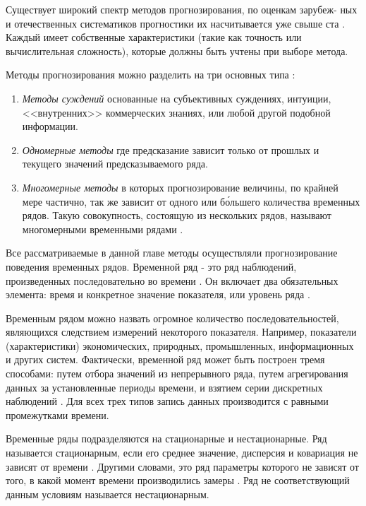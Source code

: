 \documentclass[a4paper,14pt,russian]{extreport}
\begin{document}
Существует широкий спектр методов прогнозирования, по оценкам зарубеж-
ных и отечественных систематиков прогностики их насчитывается
уже свыше ста \cite{tihonov2006}. Каждый имеет собственные характеристики 
(такие как точность или вычислительная сложность), которые должны быть 
учтены при выборе метода.

Методы прогнозирования можно разделить на три основных типа 
\cite{chatfield2000, armstrong1999, brockwell2002, hyndman2012}:
\begin{enumerate}
	\item {\itshape Методы суждений} основанные на субъективных суждениях, 
		интуиции, <<внутренних>> коммерческих знаниях, или любой другой 
		подобной информации.
	\item {\itshape Одномерные методы} где предсказание зависит только от 
		прошлых и текущего значений предсказываемого ряда.
	\item {\itshape Многомерные методы} в которых прогнозирование величины, 
		по крайней мере частично, так же зависит от одного или б\'{о}льшего 
		количества временных рядов. Такую совокупность, состоящую из 
		нескольких рядов, называют многомерными временными рядами 
		\cite{popov2006}.
\end{enumerate}

Все рассматриваемые в данной главе методы осуществляли прогнозирование 
поведения временных рядов. Временной ряд - это ряд наблюдений, 
произведенных последовательно во времени \cite{chatfield2000, armstrong1999, 
brockwell2002, box2008, wolters2007, hyndman2012}. Он включает два 
обязательных элемента: время и конкретное значение показателя, или уровень 
ряда \cite{popov2006, afanasyev2001}. 

Временным рядом можно назвать огромное количество последовательностей, 
являющихся следствием измерений некоторого показателя. Например, 
показатели (характеристики) экономических, природных, промышленных, 
информационных и других систем. Фактически, временной ряд может быть 
построен тремя способами: путем отбора значений из непрерывного ряда, путем 
агрегирования данных за установленные периоды времени, и взятием серии 
дискретных наблюдений \cite{chatfield2000, box2008}. Для всех трех типов запись 
данных производится с равными промежутками времени.

Временные ряды подразделяются на стационарные и нестационарные. Ряд 
называется стационарным, если его среднее значение, дисперсия и ковариация 
не зависят от времени \cite{popov2006}. Другими словами, это ряд параметры 
которого не зависят от того, в какой момент времени производились замеры 
\cite{hyndman2012}. Ряд не соответствующий данным условиям называется 
нестационарным.
\end{document}
